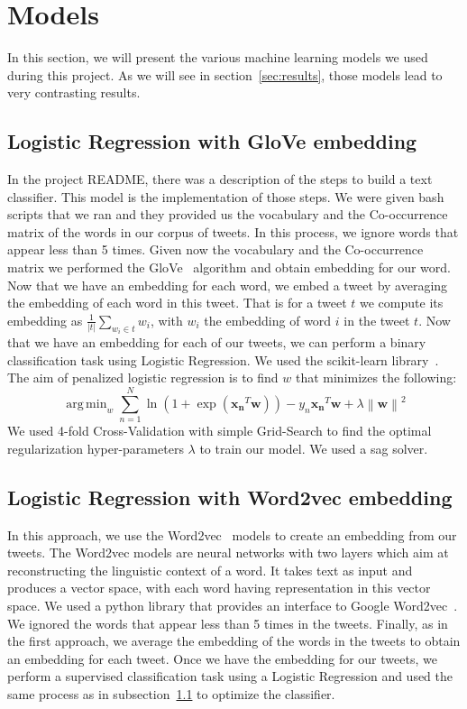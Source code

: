 \documentclass[letterpaper, 10 pt, conference]{ieeeconf}  %
\DeclareMathOperator*{\argmin}{arg\,min}
\newcommand{\norm}[1]{\left\lVert#1\right\rVert}
\begin{document}
\section{Models}
\label{sec:models}
In this section, we will present the various machine learning models we used during this project. As we will see in section~\ref{sec:results}, those models lead to very contrasting results.

\subsection{Logistic Regression with GloVe embedding}
\label{subsec:Glove}

In the project README, there was a description of the steps to build a text classifier. This model is the implementation of those steps. We were given bash scripts that we ran and they provided us the vocabulary and the Co-occurrence matrix of the words in our corpus of tweets. In this process, we ignore words that appear less than 5 times. Given now the vocabulary and the Co-occurrence matrix we performed the GloVe~\cite{pennington2014glove} algorithm and obtain embedding for our word. Now that we have an embedding for each word, we embed a tweet by averaging the embedding of each word in this tweet. That is for a tweet $t$ we compute its embedding as $\frac{1}{|t|} \sum_{w_i \in t} w_i$, with $w_i$ the embedding of word $i$ in the tweet $t$. Now that we have an embedding for each of our tweets, we can perform a binary classification task using Logistic Regression. We used the scikit-learn library~\cite{scikit-learn}. The aim of penalized logistic regression is to find $w$ that minimizes the following:
$$ \argmin_w \sum_{n=1}^{N} \ln{(1+\exp{(\boldsymbol{x_n}^T\boldsymbol{w})})} - y_n\boldsymbol{x_n}^T\boldsymbol{w} + \lambda \norm{\boldsymbol{w}}^2  $$
We used 4-fold Cross-Validation with simple Grid-Search to find the optimal regularization hyper-parameters $\lambda$ to train our model. We used a sag solver.

\subsection{Logistic Regression with Word2vec embedding}

In this approach, we use the Word2vec~\cite{2013arXiv1301.3781M} models to create an embedding from our tweets. The Word2vec models are neural networks with two layers which aim at reconstructing the linguistic context of a word. It takes text as input and produces a vector space, with each word having representation in this vector space. We used a python library that provides an interface to Google Word2vec~\cite{word2vec}. We ignored the words that appear less than 5 times in the tweets. Finally, as in the first approach, we average the embedding of the words in the tweets to obtain an embedding for each tweet. Once we have the embedding for our tweets, we perform a supervised classification task using a Logistic Regression and used the same process as in subsection~\ref{subsec:Glove} to optimize the classifier.
\end{document}
